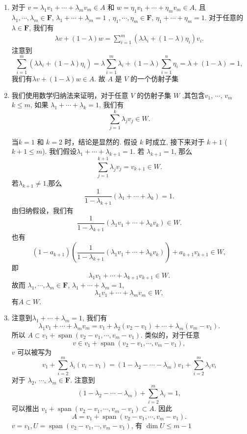 \documentclass[12pt,fontset=fandol]{ctexart}
\begin{document}
\begin{solve}
\begin{enumerate}
            \item 对于 $v=\lambda_1 v_1+\cdots+\lambda_m v_m\in A$ 和 $w=\eta_1 v_1+\cdots+\eta_m v_m\in A$, 且 $\lambda_1,\cdots,\lambda_m\in  \mathbf{F}$, $\lambda_1+\cdots+\lambda_m=1$ , $\eta_1,\cdots,\eta_m\in \mathbf{F}$, $\eta_1+\cdots+\eta_m=1$. 对于任意的$\lambda\in \mathbf{F}$, 我们有
            \begin{align*}
                \lambda v+(1-\lambda) w=\sum_{i=1}^m(\lambda\lambda_i+(1-\lambda)\eta_i)v_i.
            \end{align*}
            注意到
            \[ \sum_{i=1}^m(\lambda\lambda_i+(1-\lambda)\eta_i)=\lambda\sum_{i=1}^m\lambda_i+(1-\lambda)\sum_{i=1}^n\eta_i=\lambda+(1-\lambda)=1, \]
            我们有$\lambda v+(1-\lambda) w\in A$. 故 $A$ 是 $V$ 的一个仿射子集
        \item 我们使用数学归纳法来证明，对于任意 $V$ 的仿射子集 $W$ ,其包含$v_1$, $\cdots$, $v_m$$k\le m$,
            如果 $\lambda_1+\cdots+\lambda_k=1$,
            我们有 \[ \sum_{j=1}^k\lambda_jv_j\in W. \]

            当$k=1$ 和 $k=2$ 时，结论是显然的.
            假设 $k$ 时成立,
            接下来对于 $k+1$ ($k+1\leqslant m$).
            我们假设$\lambda_1+\cdots+\lambda_{k+1}=1$.
            若 $\lambda_{k+1}=1$, 那么\[\sum_{j=1}^{k+1}\lambda_jv_j=v_{k+1}\in W.\]
            若$\lambda_{k+1}\ne 1$,那么\[ \frac{1}{1-\lambda_{k+1}}(\lambda_1+\cdots+\lambda_k)=1. \]
            由归纳假设，我们有\[ \frac{1}{1-\lambda_{k+1}}(\lambda_1v_1+\cdots+\lambda_kv_k)\in W. \]
            也有 \[ (1-a_{k+1})\left(\frac{1}{1-\lambda_{k+1}}(\lambda_1v_1+\cdots+\lambda_kv_k)\right)+a_{k+1}v_{k+1}\in W, \]
            即 \[ \lambda_1v_1+\cdots+\lambda_{k+1}v_{k+1}\in W. \]
            故而 $\lambda_1,\cdots,\lambda_m\in  \mathbf{F}$, $\lambda_1+\cdots+\lambda_m=1$,
            \[\lambda_1 v_1+\cdots+\lambda_m v_m\in W,\]有$A\subset W$.
        \item  注意到$\lambda_1+\cdots+\lambda_m=1$, 我们有\[ \lambda_1 v_1+\cdots+\lambda_m v_m=v_1+\lambda_2(v_2-v_1)+\cdots+\lambda_m(v_m-v_1). \]所以 $A\subset v_1+\operatorname{span}(v_2-v_1,\cdots,v_m-v_1)$.
            类似的，对于任意\[v\in v_1+\operatorname{span}(v_2-v_1,\cdots,v_m-v_1),\]$v$ 可以被写为 \[ v_1+\sum_{i=2}^m \lambda_i(v_i-v_1)=(1-\lambda_2-\cdots-\lambda_m)v_1+\sum_{i=2}^m \lambda_i v_i \]
            对于 $\lambda_2$, $\cdots$, $\lambda_m\in \mathbf{F}$. 注意到\[ (1-\lambda_2-\cdots-\lambda_m)+\sum_{i=2}^m \lambda_i=1, \]
            可以推出 $v_1+\operatorname{span}(v_2-v_1,\cdots,v_m-v_1)\subset A$.
            因此\[A=v_1+\operatorname{span}(v_2-v_1,\cdots,v_m-v_1).\]
            $v=v_1, U=\operatorname{span}(v_2-v_1,\cdots,v_m-v_1)$, 有 $\dim U\le m-1$
        \end{enumerate}
\end{solve}
\end{document}
